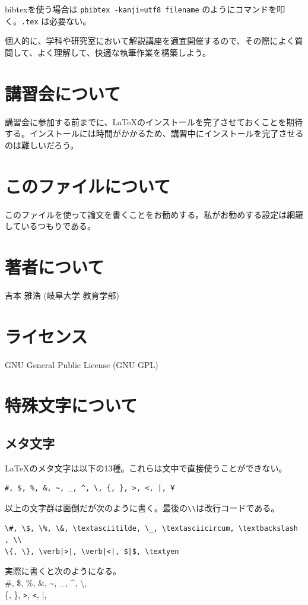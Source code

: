 \documentclass[a4j]{jsarticle}
\begin{document}
bibtexを使う場合は \verb|pbibtex -kanji=utf8 filename| のようにコマンドを叩く。\verb|.tex| は必要ない。

個人的に、学科や研究室において解説講座を適宜開催するので、その際によく質問して、よく理解して、快適な執筆作業を構築しよう。
 
\section*{講習会について}

講習会に参加する前までに、\LaTeX のインストールを完了させておくことを期待する。インストールには時間がかかるため、講習中にインストールを完了させるのは難しいだろう。

\section*{このファイルについて}
このファイルを使って論文を書くことをお勧めする。私がお勧めする設定は網羅しているつもりである。

\section*{著者について}

吉本 雅浩 (岐阜大学 教育学部)

\section*{ライセンス}

GNU General Public License (GNU GPL)

\newpage %
\section{特殊文字について}
\subsection{メタ文字}
\LaTeX のメタ文字は以下の13種。これらは文中で直接使うことができない。
\begin{verbatim}
#, $, %, &, ~, _, ^, \, {, }, >, <, |, ¥
\end{verbatim}
以上の文字群は面倒だが次のように書く。最後の\verb|\\|は改行コードである。
\begin{verbatim}
\#, \$, \%, \&, \textasciitilde, \_, \textasciicircum, \textbackslash , \\
\{, \}, \verb|>|, \verb|<|, $|$, \textyen
\end{verbatim}
実際に書くと次のようになる。\\
\#, \$, \%, \&, \textasciitilde, \_, \textasciicircum, \textbackslash , \\
\{, \}, \verb|>|, \verb|<|, $|$, \textyen
\end{document}
